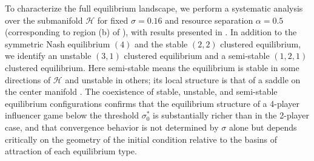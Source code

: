 \documentclass{article}
\begin{document}
                    To characterize the full equilibrium landscape, we perform a systematic analysis over the submanifold $\mathcal{H}$ for fixed $\sigma = 0.16$ and resource separation $\alpha = 0.5$ (corresponding to region (b) of ), with results presented in . In addition to the symmetric Nash equilibrium $(4)$ and the stable $(2,2)$ clustered equilibrium, we identify an unstable $(3,1)$ clustered equilibrium and a semi-stable $(1,2,1)$ clustered equilibrium. Here semi-stable means the equilibrium is stable in some directions of $\mathcal{H}$ and unstable in others; its local structure is that of a saddle on the center manifold \cite{perko2001differential}. The coexistence of stable, unstable, and semi-stable equilibrium configurations confirms that the equilibrium structure of a 4-player influencer game below the threshold $\sigma_0^*$ is substantially richer than in the 2-player case, and that convergence behavior is not determined by $\sigma$ alone but depends critically on the geometry of the initial condition relative to the basins of attraction of each equilibrium type.
\end{document}
